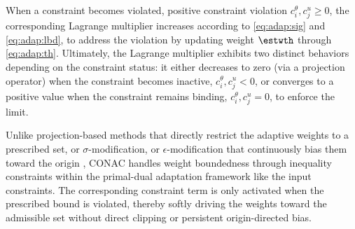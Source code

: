 \documentclass[letterpaper, journal]{IEEEtran}
\begin{document}
When a constraint becomes violated, \ie positive constraint violation $c^{\theta}_{i},c^{u}_{j}\ge0$, the corresponding Lagrange multiplier increases according to \eqref{eq:adap:sig} and \eqref{eq:adap:lbd}, to address the violation by updating weight $\estwth$ through \eqref{eq:adap:th}.
Ultimately, the Lagrange multiplier exhibits two distinct behaviors depending on the constraint status: it either decreases to zero (\eg via a projection operator) when the constraint becomes inactive, $c^{\theta}_i,c^{u}_j < 0$, or converges to a positive value when the constraint remains binding, $c^{\theta}_i,c^{u}_j = 0$, to enforce the limit.

\begin{remark} \label{rem:weight:bound}
  Unlike projection-based methods that directly restrict the adaptive weights to a prescribed set, or $\sigma$-modification, or $\epsilon$-modification that continuously bias them toward the origin \cite{Ryu:2025ab}, CONAC handles weight boundedness through inequality constraints within the primal-dual adaptation framework like the input constraints.
  The corresponding constraint term is only activated when the prescribed bound is violated, thereby softly driving the weights toward the admissible set without direct clipping or persistent origin-directed bias.
\end{remark}
\end{document}
